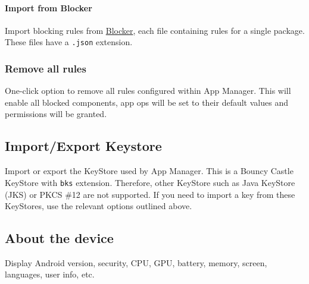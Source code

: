 \paragraph{Import from Blocker} Import blocking rules from \href{https://github.com/lihenggui/blocker}{Blocker}, each
file containing rules for a single package.
These files have a \texttt{.json} extension.

\subsubsection{Remove all rules} %
One-click option to remove all rules configured within App Manager.
This will enable all blocked components, app ops will be set to their default values and permissions will be granted.


\subsection{Import/Export Keystore}\label{subsec:import/export-keystore} %
Import or export the KeyStore used by App Manager.
This is a Bouncy Castle KeyStore with \texttt{bks} extension.
Therefore, other KeyStore such as Java KeyStore (JKS) or PKCS \#12 are not supported.
If you need to import a key from these KeyStores, use the relevant options outlined above.

\subsection{About the device}\label{subsec:device-info} %
Display Android version, security, CPU, GPU, battery, memory, screen, languages, user info, etc.
